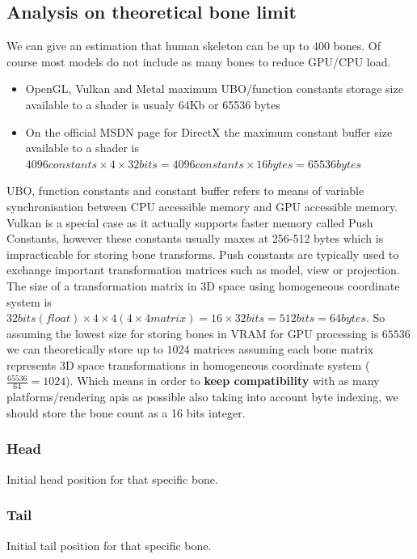 \subsection{Analysis on theoretical bone limit}
We can give an estimation that human skeleton can be up to 400 bones. Of course most models do not include as many bones to reduce GPU/CPU load.
\begin{itemize}
    \item OpenGL, Vulkan and Metal maximum UBO/function constants storage size available to a shader is usualy 64Kb or 65536 bytes
    \item On the official MSDN page \cite{MSDNConstantBuffers} for DirectX the maximum constant buffer size available to a shader is $4096 constants \times 4 \times 32 bits = 4096 constants \times 16 bytes = 65536 bytes$
\end{itemize}
UBO, function constants and constant buffer refers to means of variable synchronisation between CPU accessible memory and GPU accessible memory. Vulkan is a special case as it actually supports faster memory called Push Constants, however these constants usually maxes at 256-512 bytes which is impracticable for storing bone transforms. Push constants are typically used to exchange important transformation matrices such as model, view or projection.
The size of a transformation matrix in 3D space using homogeneous coordinate system \cite{HomogeneousCoordinates} is $32 bits (float) \times 4 \times 4 (4\times4 matrix) = 16 \times 32 bits = 512 bits = 64 bytes$.\newline
So assuming the lowest size for storing bones in VRAM for GPU processing is $65536$ we can theoretically store up to $1024$ matrices assuming each bone matrix represents 3D space transformations in homogeneous coordinate system ($\frac{65536}{64} = 1024$).\newline
Which means in order to \textbf{keep compatibility} with as many platforms/rendering apis as possible also taking into account byte indexing, we should store the bone count as a 16 bits integer.

\subsubsection{Head}
Initial head position for that specific bone.

\subsubsection{Tail}
Initial tail position for that specific bone.

